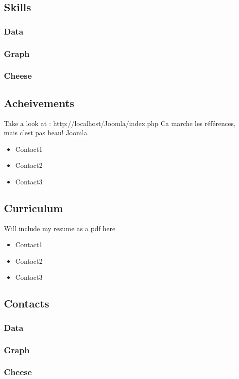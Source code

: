 \documentclass[8pt]{article} %
\begin{document}
\subsection{Skills}

{\footnotesize
\subsubsection{Data}

\subsubsection{Graph}

\subsubsection{Cheese}

}

\subsection{Acheivements}

Take a look at : http://localhost/Joomla/index.php
Ca marche les références, mais c'est pas beau!
\href{http://localhost/Joomla/index.php}{Joomla}
\begin{itemize}
  \item Contact1 
  \item Contact2 
  \item Contact3 
\end{itemize}

\subsection{Curriculum}
{\footnotesize
Will include my resume as a pdf here\\
\begin{itemize}
  \item Contact1 
  \item Contact2 
  \item Contact3 
\end{itemize}
}

\subsection{Contacts}

{\footnotesize
\subsubsection{Data}

\subsubsection{Graph}

\subsubsection{Cheese}

}
\end{document}
